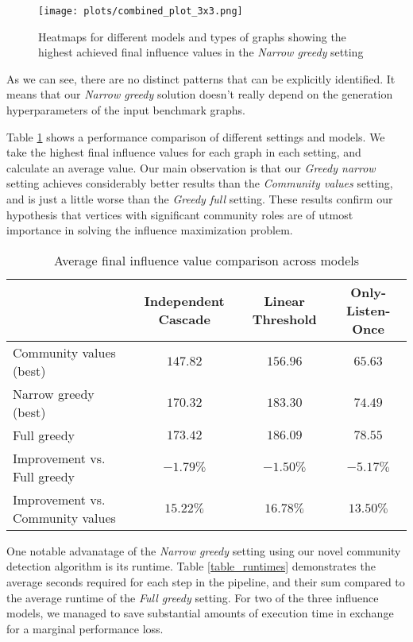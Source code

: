 \documentclass[pdflatex,sn-mathphys-num]{sn-jnl}
\begin{document}
\begin{figure}[ht]
\centering
\texttt{[image: plots/combined\_plot\_3x3.png]}
\caption{Heatmaps for different models and types of graphs showing the highest achieved final influence values in the \textit{Narrow greedy} setting}
\label{fig_performance_models_parameters}
\end{figure}

As we can see, there are no distinct patterns that can be explicitly identified. It means that our \textit{Narrow greedy} solution doesn't really depend on the generation hyperparameters of the input benchmark graphs.

Table \ref{table_performance_comparison} shows a performance comparison of different settings and models. We take the highest final influence values for each graph in each setting, and calculate an average value. Our main observation is that our \textit{Greedy narrow} setting achieves considerably better results than the \textit{Community values} setting, and is just a little worse than the \textit{Greedy full} setting. These results confirm our hypothesis that vertices with significant community roles are of utmost importance in solving the influence maximization problem.

\begin{table}[ht]
\caption{Average final influence value comparison across models}
\label{table_performance_comparison}
\begin{tabular}{@{}lccc@{}}
\toprule
& Independent Cascade & Linear Threshold & Only-Listen-Once \\
\midrule
Community values (best)\footnotemark[2] & $147.82$ & $156.96$ & $65.63$ \\
Narrow greedy (best)\footnotemark[2] & $170.32$ & $183.30$ & $74.49$ \\
Full greedy & $173.42$ & $186.09$ & $78.55$ \\
\midrule
Improvement vs. Full greedy & $-1.79\%$ & $-1.50\%$ & $-5.17\%$ \\
Improvement vs. Community values & $15.22\%$ & $16.78\%$ & $13.50\%$ \\
\midrule
\end{tabular}
\end{table}

One notable advanatage of the \textit{Narrow greedy} setting using our novel community detection algorithm is its runtime. Table \ref{table_runtimes} demonstrates the average seconds required for each step in the pipeline, and their sum compared to the average runtime of the \textit{Full greedy} setting. For two of the three influence models, we managed to save substantial amounts of execution time in exchange for a marginal performance loss.
\end{document}
